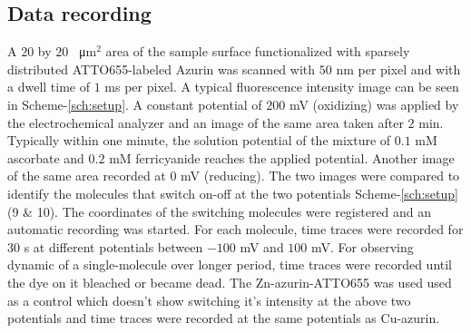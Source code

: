 \documentclass[journal=jacsat,manuscript=article]{achemso}
\begin{document}
\subsection{Data recording}
A $20$ by $20$ \SI{}{\micro\metre}$^2$ area of the sample surface functionalized with sparsely distributed ATTO655-labeled Azurin was scanned with $50$ nm per pixel and with a dwell time of $1$ ms per pixel. A typical fluorescence intensity image can be seen in Scheme-\ref{sch:setup}. A constant potential of $200$ mV (oxidizing) was applied by the electrochemical analyzer and an image of the same area taken after $2$ min. Typically within one minute, the solution potential of the mixture of $0.1$ mM ascorbate and $0.2$ mM ferricyanide reaches the applied potential. Another image of the same area recorded at $0$ mV (reducing). The two images were compared to identify the molecules that switch on-off at the two potentials Scheme-\ref{sch:setup} (9 \& 10). The coordinates of the switching molecules were registered and an automatic recording was started. For each molecule, time traces were recorded for $30$ s at different potentials between $-100$ mV and $100$ mV. For observing dynamic of a single-molecule over longer period, time traces were recorded until the dye on it bleached or became dead. The Zn-azurin-ATTO655 was used used as a control which doesn't show switching it's intensity at the above two potentials and time traces were recorded at the same potentials as Cu-azurin.
\end{document}
